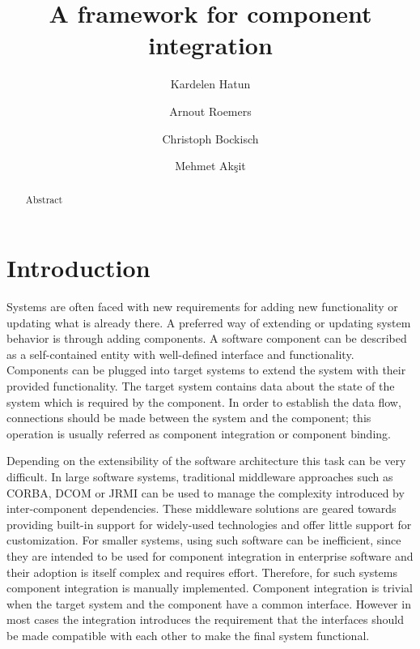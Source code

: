 \documentclass{llncs}
\begin{document}
\title{A framework for component integration}

\author{Kardelen Hatun \and Arnout Roemers \and Christoph Bockisch \and Mehmet Ak\c{s}it}
\maketitle

\begin{abstract}
Abstract 
\end{abstract}

\section{Introduction}
Systems are often faced with new requirements for adding new functionality or updating what is already there. 
A preferred way of extending or updating system behavior is through adding components. 
A software component can be described as a self-contained entity with well-defined interface and functionality. 
Components can be plugged into target systems to extend the system with their provided functionality.
The target system contains data about the state of the system which is required by the component. 
In order to establish the data flow, connections should be made between the system and the component; this operation is usually referred as component integration or component binding. 

Depending on the extensibility of the software architecture this task can be very difficult. 
In large software systems, traditional middleware approaches such as CORBA, DCOM or JRMI can be used to manage the complexity introduced by inter-component dependencies. 
These middleware solutions are geared towards providing built-in support for widely-used technologies and offer little support for customization. 
For smaller systems, using such software can be inefficient, since they are intended to be used for component integration in enterprise software and their adoption is itself complex and requires effort. Therefore, for such systems component integration is manually implemented. Component integration is trivial when the target system and the component have a common interface. However in most cases the integration introduces the requirement that the interfaces should be made compatible with each other to make the final system functional.
\end{document}
